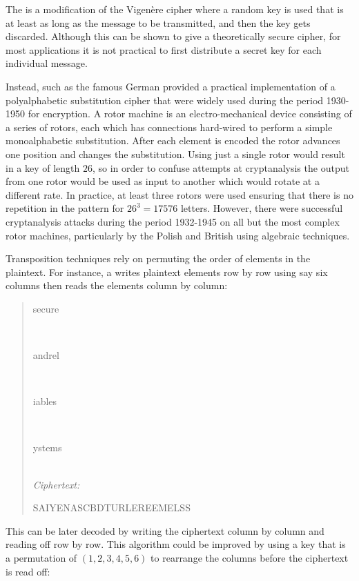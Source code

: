 The  is a modification of the Vigen\`ere cipher where a random key
is used that is at least as long as the message to be transmitted, and then the key
gets discarded. Although this can be shown to give a theoretically secure cipher,
for most applications it is not practical to first distribute a secret key for
each individual message.

Instead,  such as the famous German 
provided a practical implementation of a polyalphabetic substitution cipher that
were widely used during the period 1930-1950 for encryption.
A rotor machine is an electro-mechanical device consisting of a series of rotors,
each which has connections hard-wired to perform a simple monoalphabetic substitution.
After each element is encoded the rotor advances one position and changes the substitution.
Using just a single rotor would result in a key of length $26$, so in order to confuse
attempts at cryptanalysis the output from one rotor would be used as input to another
which would rotate at a different rate. In practice, at least three rotors were used
ensuring that there is no repetition in the pattern for $26^3=17576$ letters.
However, there were successful cryptanalysis attacks during the period 1932-1945
on all but the most complex rotor machines,
particularly by the Polish and British using algebraic techniques.

Transposition techniques rely on permuting the order of elements in the plaintext.
For instance, a  writes plaintext elements row by row
using say six columns then reads the elements column by column:
\begin{quote}
  \begin{code}secure\end{code} \\
  \begin{code}andrel\end{code} \\
  \begin{code}iables\end{code} \\
  \begin{code}ystems\end{code} \\
  \emph{Ciphertext:} \begin{code}SAIYENASCBDTURLEREEMELSS\end{code}
\end{quote}
This can be later decoded by writing the ciphertext column by column and reading off row by row.
This algorithm could be improved by using a key that is a permutation of
$(1,2,3,4,5,6)$ to rearrange the columns before the ciphertext is read off:

